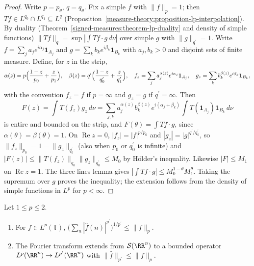 \begin{proof}
Write $p = p_\theta$, $q = q_\theta$. Fix a simple $f$ with $\|f\|_p = 1$; then $Tf \in L^{q_0} \cap L^{q_1} \subseteq L^q$ (Proposition~\ref{measure-theory:proposition-lp-interpolation}). By duality
(Theorem~\ref{signed-measures:theorem-lp-duality} and density of simple functions) $\|Tf\|_q = \sup|\int Tf\cdot g\,d\nu|$ over simple $g$ with $\|g\|_{q^{\prime}} = 1$. Write $f = \sum_ja_je^{i\alpha_j}\mathbf{1}_{A_j}$ and
$g = \sum_kb_ke^{i\beta_k}\mathbf{1}_{B_k}$ with $a_j, b_k > 0$ and disjoint sets of finite measure. Define, for $z$ in the strip,
\[
\alpha(z) = p\Bigl(\frac{1 - z}{p_0} + \frac{z}{p_1}\Bigr), \quad \beta(z) = q^{\prime}\Bigl(\frac{1 - z}{q_0^{\prime}} + \frac{z}{q_1^{\prime}}\Bigr), \quad f_z = \sum_ja_j^{\alpha(z)}e^{i\alpha_j}\mathbf{1}_{A_j}, \quad
g_z = \sum_kb_k^{\beta(z)}e^{i\beta_k}\mathbf{1}_{B_k},
\]
with the convention $f_z = f$ if $p = \infty$ and $g_z = g$ if $q^{\prime} = \infty$. Then
\[
F(z) = \int T(f_z)g_z\,d\nu = \sum_{j,k}a_j^{\alpha(z)}b_k^{\beta(z)}e^{i(\alpha_j + \beta_k)}\int T(\mathbf{1}_{A_j})\mathbf{1}_{B_k}\,d\nu
\]
is entire and bounded on the strip, and $F(\theta) = \int Tf\cdot g$, since $\alpha(\theta) = \beta(\theta) = 1$. On $\operatorname{Re}z = 0$, $|f_z| = |f|^{p/p_0}$ and $|g_z| = |g|^{q^{\prime}/q_0^{\prime}}$, so
$\|f_z\|_{p_0} = 1 = \|g_z\|_{q_0^{\prime}}$ (also when $p_0$ or $q_0^{\prime}$ is infinite) and $|F(z)| \leq \|T(f_z)\|_{q_0}\|g_z\|_{q_0^{\prime}} \leq M_0$ by H\"older's inequality. Likewise $|F| \leq M_1$ on $\operatorname{Re}z = 1$.
The three lines lemma gives $|\int Tf\cdot g| \leq M_0^{1-\theta}M_1^\theta$. Taking the supremum over $g$ proves the inequality; the extension follows from the density of simple functions in $L^p$ for $p < \infty$.
\end{proof}

\begin{corollary}\label{harmonic-analysis:corollary-hausdorff-young}
Let $1 \leq p \leq 2$.
\begin{enumerate}
\item For $f \in L^p(\mathbb{T})$, $\bigl(\sum_n|\hat f(n)|^{p^{\prime}}\bigr)^{1/p^{\prime}} \leq \|f\|_p$.
\item The Fourier transform extends from $\mathcal{S}(\RR^n)$ to a bounded operator $L^p(\RR^n) \to L^{p^{\prime}}(\RR^n)$ with $\|\hat f\|_{p^{\prime}} \leq \|f\|_p$.
\end{enumerate}
\end{corollary}

